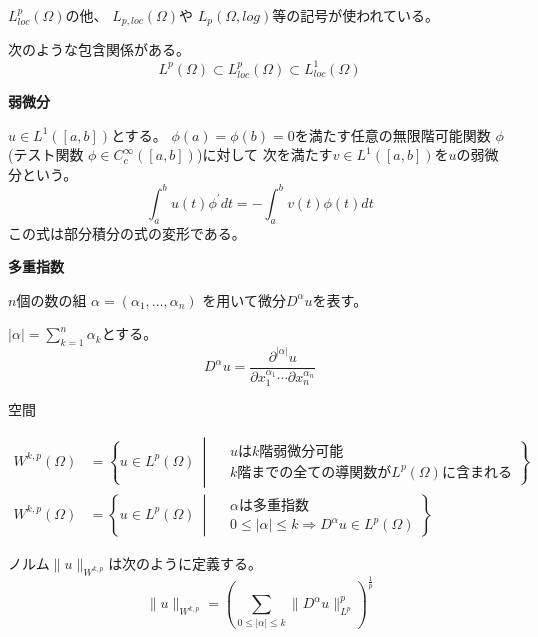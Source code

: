 \documentclass[12pt,b5paper]{ltjsarticle}
\begin{document}
$L^{p}_{loc}(\Omega)$の他、
$L_{p,loc}(\Omega)$や
$L_{p}(\Omega,log)$等の記号が使われている。

次のような包含関係がある。
\begin{equation}
 L^{p}(\Omega)
  \subset L^{p}_{loc}(\Omega)
  \subset L^{1}_{loc}(\Omega)
\end{equation}


\dotfill

\textbf{弱微分}

$u\in L^{1}([a,b])$とする。
$\phi(a)=\phi(b)=0$を満たす任意の無限階可能関数
$\phi$(テスト関数 $\phi\in C_{c}^{\infty}([a,b])$)に対して
次を満たす$v\in L^{1}([a,b])$を$u$の弱微分という。
\begin{equation}
 \int_{a}^{b}u(t)\phi^{\prime}dt = -\int_{a}^{b} v(t)\phi(t) dt
\end{equation}
この式は部分積分の式の変形である。



\dotfill

\textbf{多重指数}

$n$個の数の組
$\alpha = (\alpha_{1},\dots , \alpha_{n})$
を用いて微分$D^{\alpha}u$を表す。

$\lvert \alpha \rvert = \sum_{k=1}^{n}\alpha_{k}$とする。
\begin{equation}
 D^{\alpha}u = \frac{\partial^{\lvert \alpha \rvert} u}{\partial x_{1}^{\alpha_{1}}\cdots\partial x_{n}^{\alpha_{n}}}
\end{equation}

\dotfill


空間

\begin{align}
 W^{k,p}(\Omega) &= \left\{ u\in L^{p}(\Omega) \: \middle| \:
  \begin{aligned}
   & u は k 階弱微分可能\\
   & k 階までの全ての導関数が L^{p}(\Omega) に含まれる
  \end{aligned}
 \right\}\\
 W^{k,p}(\Omega) &= \left\{ u\in L^{p}(\Omega) \: \middle| \:
  \begin{aligned}
   & \alpha は 多重指数\\
   & 0 \leq \lvert \alpha \rvert \leq k \Rightarrow D^{\alpha}u \in L^{p}(\Omega)
  \end{aligned}
 \right\}
\end{align}


ノルム$\| u \|_{W^{k,p}}$は次のように定義する。
\begin{equation}
 \| u \|_{W^{k,p}} =
  \left( \sum_{0 \leq \lvert \alpha \rvert \leq k} \| D^{\alpha} u \|_{L^{p}}^{p} \right)^{\frac{1}{p}}
\end{equation}
\end{document}
